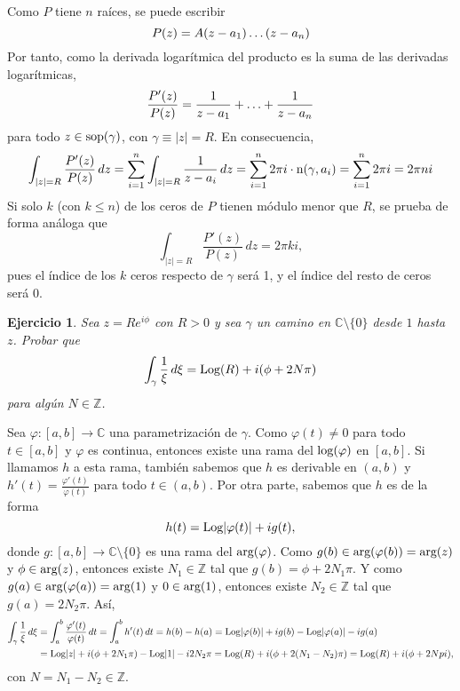 \documentclass[11pt]{report}
\makeatletter
\renewenvironment{proof}[1][\proofname]{\par
  \pushQED{\qed}%
  \normalfont \topsep\z@skip %
  \trivlist
  \item[\hskip\labelsep
        \itshape
    #1\@addpunct{.}]\ignorespaces
}{%
  \popQED\endtrivlist\@endpefalse
}
\newcommand{\Z}{\mathbb Z}
\newcommand{\C}{\mathbb C}
\newtheorem{exercise}{Ejercicio}
\makeatother
\begin{document}
\begin{proof}
Como $P$ tiene $n$ raíces, se puede escribir
\[P(z) = A(z-a_1)\mathellipsis(z-a_n)\]
Por tanto, como la derivada logarítmica del producto es la suma de las derivadas logarítmicas,
\[\frac{P'(z)}{P(z)} = \frac{1}{z-a_1}+\mathellipsis+\frac{1}{z-a_n}\]
para todo $z \in \textup{sop}(\gamma)$, con $\gamma \equiv |z| = R$. En consecuencia,
\[\int_{|z| = R} \frac{P'(z)}{P(z)} \, dz = \sum_{i=1}^n\int_{|z| = R}\frac{1}{z-a_i} \, dz = \sum_{i=1}^n 2\pi i \cdot \textup{n}(\gamma,a_i) = \sum_{i=1}^n 2\pi i = 2\pi n i\]
Si solo $k$ (con $k \leq n$) de los ceros de $P$ tienen módulo menor que $R$, se prueba de forma análoga que
\[\int_{|z| = R} \frac{P'(z)}{P(z)} \, dz = 2\pi k i,\]
pues el índice de los $k$ ceros respecto de $\gamma$ será 1, y el índice del resto de ceros será $0$.
\end{proof}

\begin{exercise}
Sea $z = Re^{i\phi}$ con $R>0$ y sea $\gamma$  un camino en $\C \setminus \{0\}$ desde $1$ hasta $z$. Probar que
\[\int_{\gamma}\frac{1}{\xi} \, d\xi = \textup{Log}(R) + i(\phi+2N\pi)\]
para algún $N \in \Z$.
\end{exercise}

\begin{proof}
Sea $\varphi \colon [a,b] \to \C$ una parametrización de $\gamma$. Como $\varphi(t) \neq 0$ para todo $t \in [a,b]$ y $\varphi$ es continua, entonces existe una rama del $\textup{log}(\varphi)$ en $[a,b]$. Si llamamos $h$ a esta rama, también sabemos que $h$ es derivable en $(a,b)$ y $h'(t) = \frac{\varphi'(t)}{\varphi(t)}$ para todo $t \in (a,b)$. Por otra parte, sabemos que $h$ es de la forma
\[h(t) = \textup{Log}|\varphi(t)| +ig(t),\]
donde $g \colon [a,b] \to \C \setminus \{0\}$ es una rama del $\textup{arg}(\varphi)$. Como $g(b) \in \textup{arg}(\varphi(b)) = \textup{arg}(z)$ y $\phi \in \textup{arg}(z)$, entonces existe $N_1 \in \Z$ tal que $g(b) = \phi+2N_1\pi$. Y como $g(a) \in \textup{arg}(\varphi(a)) = \textup{arg}(1)$ y $0 \in \textup{arg}(1)$, entonces existe $N_2 \in \Z$ tal que $g(a) = 2N_2 \pi$. Así,
\[
\begin{aligned}[t]
\int_{\gamma} \frac{1}{\xi} \, d\xi &= \int_a^b \frac{\varphi'(t)}{\varphi(t)} \, dt = \int_a^b h'(t) \, dt = h(b)-h(a) = \textup{Log}|\varphi(b)|+ig(b)-\textup{Log}|\varphi(a)|-ig(a) \\&= \textup{Log}|z|+i(\phi+2N_1\pi)-\textup{Log}|1|-i2N_2\pi = \textup{Log}(R)+i(\phi+2(N_1-N_2)\pi) = \textup{Log}(R)+i(\phi+2Npi),
\end{aligned}
\]
con $N = N_1-N_2 \in \Z$.
\end{proof}
\end{document}
